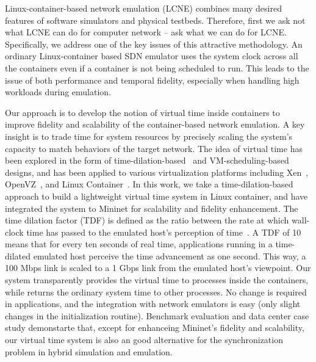 \label{VT:Sec:Intro}

Linux-container-based network emulation (LCNE) combines many desired features of software simulators and physical testbeds.
Therefore, first we ask not what LCNE can do for computer network -- ask what we can do for LCNE.
Specifically, we address one of the key issues of this attractive methodology.
An ordinary Linux-container based SDN emulator uses the system clock across all the containers even if a container is not being scheduled to run.
This leads to the issue of both performance and temporal fidelity, especially when handling high workloads during emulation.

Our approach is to develop the notion of virtual time inside containers to improve fidelity and scalability of the container-based network emulation.
A key insight is to trade time for system resources by precisely scaling the system's capacity to match behaviors of the target network.
The idea of virtual time has been explored in the form of time-dilation-based~\cite{ToInfinityBeyond} and
VM-scheduling-based~\cite{VirtTimeOpenVZ, SliceTime} designs, and has been applied to various virtualization platforms including Xen~\cite{DieCast},
OpenVZ~\cite{VirtTimeOpenVZ}, and Linux Container~\cite{TimeKeeper}.
In this work, we take a time-dilation-based approach to build a lightweight virtual time system in Linux container,
and have integrated the system to Mininet for scalability and fidelity enhancement.
The time dilation factor (TDF) is defined as the ratio between the rate at which wall-clock time has
passed to the emulated host's perception of time~\cite{ToInfinityBeyond}.
A TDF of 10 means that for every ten seconds of real time, applications running in a time-dilated emulated host perceive the time advancement as one second.
This way, a 100 Mbps link is scaled to a 1 Gbps link from the emulated host's viewpoint.
Our system transparently provides the virtual time to processes inside the containers,
while returns the ordinary system time to other processes.
No change is required in applications, and the integration with network emulators is easy (only slight changes in the initialization routine).
Benchmark evaluation and data center case study demonstarte that, except for enhanceing Mininet's fidelity and scalability,
our virtual time system is also an good alternative for the synchronization problem in hybrid simulation and emulation.

